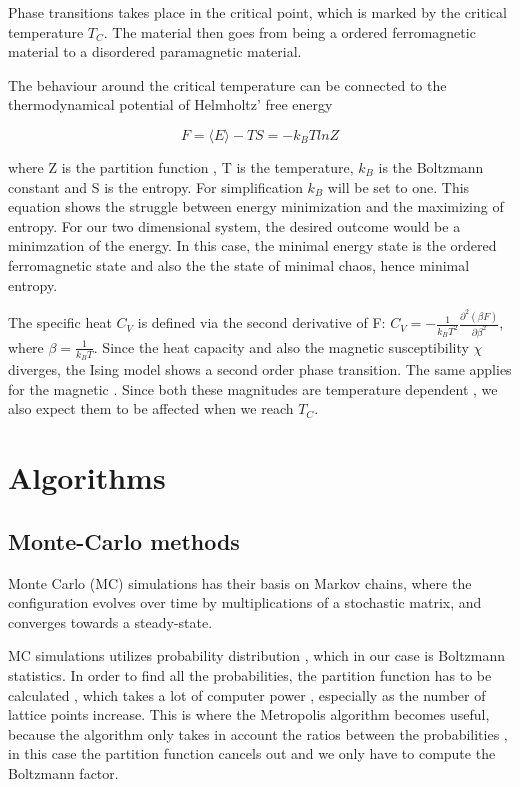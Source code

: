 \documentclass{article}
\begin{document}
Phase transitions takes place  in the critical point, which is marked by the critical temperature $T_C$. The material then goes from being a ordered ferromagnetic material to a disordered paramagnetic material. 

The behaviour around the critical temperature can be connected to the thermodynamical  potential of  Helmholtz' free energy

\begin{equation}

    F = \langle E \rangle - TS = - k_B TlnZ

\end{equation}

where Z is the partition function , T is the temperature, $k_B$ is the Boltzmann constant and S is the entropy. For simplification  $k_B $ will be set to one.  This equation shows the struggle between energy minimization and the maximizing of entropy. For our two dimensional system, the desired outcome would be a minimzation of the energy. In this case, the minimal energy state is the ordered ferromagnetic state and also the the state of minimal chaos, hence minimal entropy.  \newline

The specific heat $C_V$ is defined via the second derivative of F: $C_V = - \frac{1}{k_B T^2}\frac{\partial^2(\beta F)}{\partial \beta ^2}$, where $\beta = \frac{1}{k_B T}$. Since the heat capacity and also the magnetic susceptibility  $\chi$  diverges, the Ising model shows a second order phase transition. The same applies for the magnetic . Since both these magnitudes are temperature dependent , we also expect them to be affected when we reach $T_C$. \newline




\section{Algorithms}

\subsection{Monte-Carlo methods }\label{const_mot}
Monte Carlo (MC) simulations has their basis on Markov chains, where the configuration evolves over time by multiplications of a stochastic matrix, and converges towards a steady-state.

MC simulations utilizes probability distribution , which in our case is Boltzmann statistics. In order to find all the probabilities, the partition function has to be calculated , which takes a lot  of computer power , especially as the number of lattice points increase. This is where the Metropolis algorithm becomes useful, because the algorithm only takes in account the ratios between the probabilities , in this case the partition function cancels out and we only have to compute the Boltzmann factor.
\end{document}
